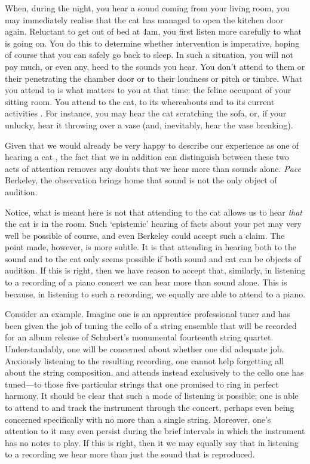 \documentclass[sloppy, journal, git, bytitle, dodraft]{humapap}
\begin{document}
When, during the night, you hear a sound coming from your living room, you may immediately realise that the cat has managed to open the kitchen door again. Reluctant to get out of bed at 4am, you first listen more carefully to what is going on. You do this to determine whether intervention is imperative, hoping of course that you can safely go back to sleep. In such a situation, you will not pay much, or even any, heed to the sounds you hear. You don't attend to them or their penetrating the chamber door or to their loudness or pitch or timbre. What you attend to is what matters to you at that time: the feline occupant of your sitting room. You attend to the cat, to its whereabouts and to its current activities \autocite{nudds2013aa}. For instance, you may hear the cat scratching the sofa, or, if your unlucky, hear it throwing over a vase (and, inevitably, hear the vase breaking).

Given that we would already be very happy to describe our experience as one of hearing a cat \autocite{urmson1968aa}, the fact that we in addition can distinguish between these two acts of attention removes any doubts that we hear more than sounds alone. \emph{Pace} Berkeley, the observation brings home that sound is not the only object of audition.  

Notice, what is meant here is not that attending to the cat allows us to hear \emph{that} the cat is in the room. Such `epistemic' hearing of facts about your pet may very well be possible of course, and even Berkeley could accept such a claim. The point made, however, is more subtle. It is that attending in hearing both to the sound and to the cat only seems possible if both sound and cat can be objects of audition. If this is right, then we have reason to accept that, similarly, in listening to a recording of a piano concert we can hear more than sound alone. This is because, in listening to such a recording, we equally are able to attend to a piano. %

Consider an example. Imagine one is an apprentice professional tuner and has been given the job of tuning the cello of a string ensemble that will be recorded for an album release of Schubert's monumental fourteenth string quartet. Understandably, one will be concerned about whether one did adequate job. Anxiously listening to the resulting recording, one cannot help forgetting all about the string composition, and attends instead exclusively to the cello one has tuned---to those five particular strings that one promised to ring in perfect harmony. It should be clear that such a mode of listening is possible; one is able to attend to and track the instrument through the concert, perhaps even being concerned specifically with no more than a single string. Moreover, one's attention to it may even persist during the brief intervals in which the instrument has no notes to play. If this is right, then it we may equally say that in listening to a recording we hear more than just the sound that is reproduced.
\end{document}
